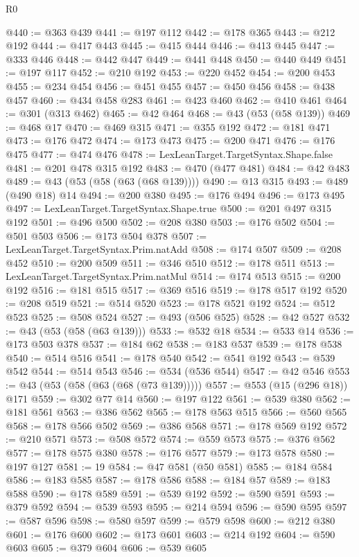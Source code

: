 \begin{lexlean}{R0}
\begin{coremodule}
@440 := @363 @439
@441 := @197 @112
@442 := @178 @365
@443 := @212 @192
@444 := @417 @443
@445 := @415 @444
@446 := @413 @445
@447 := @333 @446
@448 := @442 @447
@449 := @441 @448
@450 := @440 @449
@451 := @197 @117
@452 := @210 @192
@453 := @220 @452
@454 := @200 @453
@455 := @234 @454
@456 := @451 @455
@457 := @450 @456
@458 := @438 @457
@460 := @434 @458 @283
@461 := @423 @460
@462 := @410 @461
@464 := @301 (@313 @462)
@465 := @42 @464
@468 := @43 (@53 (@58 @139))
@469 := @468 @17
@470 := @469 @315
@471 := @355 @192
@472 := @181 @471
@473 := @176 @472
@474 := @173 @473
@475 := @200 @471
@476 := @176 @475
@477 := @474 @476
@478 := LexLeanTarget.TargetSyntax.Shape.false
@481 := @201 @478 @315 @192
@483 := @470 (@477 @481)
@484 := @42 @483
@489 := @43 (@53 (@58 (@63 (@68 @139))))
@490 := @13 @315
@493 := @489 (@490 @18) @14
@494 := @200 @380
@495 := @176 @494
@496 := @173 @495
@497 := LexLeanTarget.TargetSyntax.Shape.true
@500 := @201 @497 @315 @192
@501 := @496 @500
@502 := @208 @380
@503 := @176 @502
@504 := @501 @503
@506 := @173 @504 @378
@507 := LexLeanTarget.TargetSyntax.Prim.natAdd
@508 := @174 @507
@509 := @208 @452
@510 := @200 @509
@511 := @346 @510
@512 := @178 @511
@513 := LexLeanTarget.TargetSyntax.Prim.natMul
@514 := @174 @513
@515 := @200 @192
@516 := @181 @515
@517 := @369 @516
@519 := @178 @517 @192
@520 := @208 @519
@521 := @514 @520
@523 := @178 @521 @192
@524 := @512 @523
@525 := @508 @524
@527 := @493 (@506 @525)
@528 := @42 @527
@532 := @43 (@53 (@58 (@63 @139)))
@533 := @532 @18
@534 := @533 @14
@536 := @173 @503 @378
@537 := @184 @62
@538 := @183 @537
@539 := @178 @538
@540 := @514 @516
@541 := @178 @540
@542 := @541 @192
@543 := @539 @542
@544 := @514 @543
@546 := @534 (@536 @544)
@547 := @42 @546
@553 := @43 (@53 (@58 (@63 (@68 (@73 @139)))))
@557 := @553 (@15 (@296 @18)) @171
@559 := @302 @77 @14
@560 := @197 @122
@561 := @539 @380
@562 := @181 @561
@563 := @386 @562
@565 := @178 @563 @515
@566 := @560 @565
@568 := @178 @566 @502
@569 := @386 @568
@571 := @178 @569 @192
@572 := @210 @571
@573 := @508 @572
@574 := @559 @573
@575 := @376 @562
@577 := @178 @575 @380
@578 := @176 @577
@579 := @173 @578
@580 := @197 @127
@581 := 19
@584 := @47 @581 (@50 @581)
@585 := @184 @584
@586 := @183 @585
@587 := @178 @586
@588 := @184 @57
@589 := @183 @588
@590 := @178 @589
@591 := @539 @192
@592 := @590 @591
@593 := @379 @592
@594 := @539 @593
@595 := @214 @594
@596 := @590 @595
@597 := @587 @596
@598 := @580 @597
@599 := @579 @598
@600 := @212 @380
@601 := @176 @600
@602 := @173 @601
@603 := @214 @192
@604 := @590 @603
@605 := @379 @604
@606 := @539 @605

\end{coremodule}
\end{lexlean}
